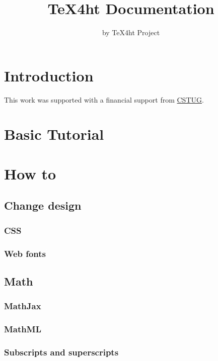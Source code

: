 \documentclass{book}
\title{TeX4ht Documentation}
\author{by TeX4ht Project}
\begin{document}
\maketitle

\ifdefined\HCode\else\tableofcontents\fi


\chapter{Introduction}


\begin{acknowledgements}
This work was supported with a financial support from \href{https://cstug.cz/}{CSTUG}.
\end{acknowledgements}

\chapter{Basic Tutorial}
\chapter{How to}

\section{Change design}
\subsection{CSS}
\subsection{Web fonts}

\section{Math}

\subsection{MathJax}
\subsection{MathML}
\subsection{Subscripts and superscripts}

\end{document}
